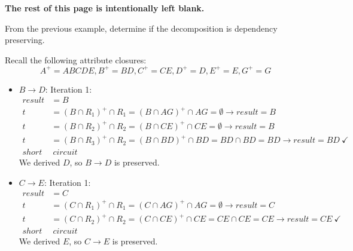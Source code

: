 \documentclass{report}
\newenvironment{example}{\begin{tcolorbox}[title={Example},colback=green!5!white,colframe=black!75!green]}{\end{tcolorbox}}
\renewcommand{\bf}[1]{\textbf{{#1}}}
\begin{document}
\begin{center}
    \bf{The rest of this page is intentionally left blank.}
\end{center}

\begin{example}
    From the previous example, determine if the decomposition is dependency preserving.
    \vspace{1em}

    Recall the following attribute closures:
    \[A^+ = ABCDE, B^+ = BD, C^+ = CE, D^+ = D, E^+ = E, G^+ = G\]
    \begin{itemize}[label=, itemsep=0em, leftmargin=*]
        \item $B \to D$:
            \newline
            \noindent Iteration 1:
            \vspace{-1em}
            \begin{align*}
                result &= B \\
                t &= (B \cap R_1)^+ \cap R_1
                = (B \cap AG)^+ \cap AG
                = \emptyset \to result = B \\
                t &= (B \cap R_2)^+ \cap R_2
                = (B \cap CE)^+ \cap CE
                = \emptyset \to result = B \\
                t &= (B \cap R_3)^+ \cap R_2
                = (B \cap BD)^+ \cap BD
                = BD \cap BD
                = BD \to result = BD \ \checkmark \\
                short &\ circuit
            \end{align*}
            We derived $D$, so $B \to D$ is preserved.
        \item $C \to E$:
            \newline
            \noindent Iteration 1:
            \vspace{-1em}
            \begin{align*}
                result &= C \\
                t &= (C \cap R_1)^+ \cap R_1
                = (C \cap AG)^+ \cap AG
                = \emptyset \to result = C \\
                t &= (C \cap R_2)^+ \cap R_2
                = (C \cap CE)^+ \cap CE
                = CE \cap CE = CE \to result = CE \ \checkmark \\
                short &\ circuit
            \end{align*}
            We derived $E$, so $C \to E$ is preserved.

\end{itemize}
\end{example}
\end{document}

